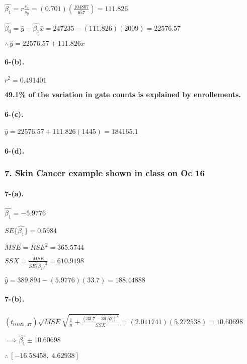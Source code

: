 \documentclass[]{article}
\let\oldparagraph\paragraph
\renewcommand{\paragraph}[1]{\oldparagraph{#1}\mbox{}}
\begin{document}
\(\hat{\beta_{1}} = r \frac{s_x}{s_y} = (0.701)(\frac{104807}{657}) = 111.826\)

\(\hat{\beta_{0}} = \bar{y} - \hat{\beta_{1}} \bar{x} = 247235 - (111.826)(2009) = 22576.57\)

\(\therefore \: \hat{y} = 22576.57 + 111.826x\)

\paragraph{6-(b).}\label{b.-4}

\(r^2 = 0.491401\)

\textbf{49.1\% of the variation in gate counts is explained by
enrollements.}

\paragraph{6-(c).}\label{c.-2}

\(\hat{y} = 22576.57 + 111.826(1445) = 184165.1\)

\paragraph{6-(d).}\label{d.-1}

\subsubsection{7. Skin Cancer example shown in class on Oc
16}\label{skin-cancer-example-shown-in-class-on-oc-16}

\paragraph{7-(a).}\label{a.-3}

\(\hat{\beta_1} = -5.9776\)

\(SE\{\hat{\beta_1}\} = 0.5984\)

\(MSE = RSE^2 = 365.5744\)

\(SSX = \frac{MSE}{SE\{\hat{\beta_1}\}^2} = 610.9198\)

\(\hat{y} = 389.894 - (5.9776)(33.7) = 188.44888\)

\paragraph{7-(b).}\label{b.-5}

\((t_{{0.025}, 47})\sqrt{MSE}\sqrt{\frac{1}{n} + \frac{(33.7-39.52)^2}{SSX}} = (2.011741)(5.272538) = 10.60698\)

\(\implies \hat{\beta_1} \pm 10.60698\)

\(\therefore  \: [-16.58458, \; 4.62938]\)
\end{document}
